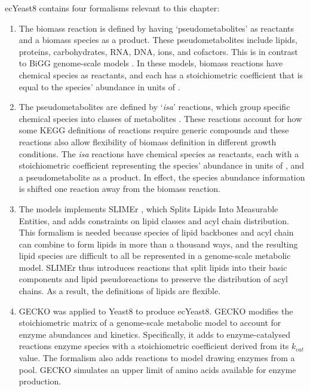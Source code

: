 ecYeast8 contains four formalisms relevant to this chapter:
\begin{enumerate}
  \item
        The biomass reaction is defined by having `pseudometabolites' as reactants and a biomass species as a product.
        These pseudometabolites include lipids, proteins, carbohydrates, RNA, DNA, ions, and cofactors.
        This is in contrast to BiGG genome-scale models \parencite{norsigianBiGGModels20202020}.
        In these models, biomass reactions have chemical species as reactants, and each has a stoichiometric coefficient that is equal to the species' abundance in units of \SI{}{\mmolgdw}.
  \item
        The pseudometabolites are defined by `\textit{isa}' reactions, which group specific chemical species into classes of metabolites \parencite{heavnerYeastExpandedReconstruction2012}.
        These reactions account for how some KEGG definitions of reactions require generic compounds and these reactions also allow flexibility of biomass definition in different growth conditions.
        The \textit{isa} reactions have chemical species as reactants, each with a stoichiometric coefficient representing the species' abundance in units of \SI{}{\mmolgdw}, and a pseudometabolite as a product.
        In effect, the species abundance information is shifted one reaction away from the biomass reaction.
  \item
        The models implements SLIMEr \parencite{sanchezSLIMErProbingFlexibility2019}, which Splits Lipids Into Measurable Entities, and adds constraints on lipid classes and acyl chain distribution.
        This formalism is needed because species of lipid backbones and acyl chain can combine to form lipids in more than a thousand ways, and the resulting lipid species are difficult to all be represented in a genome-scale metabolic model.
        SLIMEr thus introduces reactions that split lipids into their basic components and lipid pseudoreactions to preserve the distribution of acyl chains.
        As a result, the definitions of lipids are flexible.
  \item
        GECKO was applied to Yeast8 to produce ecYeast8.
        GECKO modifies the stoichiometric matrix of a genome-scale metabolic model to account for enzyme abundances and kinetics.
        Specifically, it adds to enzyme-catalysed reactions enzyme species with a stoichiometric coefficient derived from its $k_{cat}$ value.
        The formalism also adds reactions to model drawing enzymes from a pool.
        GECKO simulates an upper limit of amino acids available for enzyme production.
\end{enumerate}

